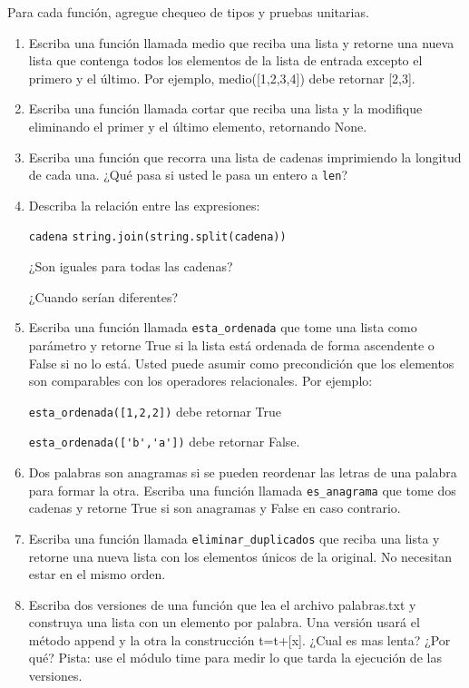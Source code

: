 Para cada función, agregue chequeo de tipos y pruebas unitarias.


\begin{enumerate}

 \item Escriba una función llamada medio que reciba una lista y retorne una nueva lista que contenga todos los elementos de la lista de 
 entrada excepto el primero y el último. Por ejemplo, medio([1,2,3,4]) debe retornar [2,3].

 \item Escriba una función llamada cortar que reciba una lista y la modifique eliminando el primer y el último elemento, retornando None.

 \item Escriba una función que  recorra una lista de cadenas 
   imprimiendo la longitud de cada una. ¿Qué pasa si usted
   le pasa un entero a  \texttt{len}?

 \item Describa la relación entre las expresiones: 
 
 \texttt{cadena} \hfill  {\tt string.join(string.split(cadena))}
 
 ¿Son iguales para todas las cadenas? 
 
 ¿Cuando serían diferentes?
  
  \item Escriba una función llamada \verb+esta_ordenada+ que tome una lista como parámetro y
  retorne True si la lista está ordenada de forma ascendente o False si no lo está.
  Usted puede asumir como precondición que los elementos son comparables con los 
  operadores relacionales. Por ejemplo: 
  
  \verb+esta_ordenada([1,2,2])+ debe retornar  True 
  
  \verb+esta_ordenada(['b','a'])+ debe retornar False.
  
  \item Dos palabras son anagramas si se pueden reordenar las letras de una palabra para formar
  la otra. Escriba una función llamada \verb+es_anagrama+ que tome dos cadenas y retorne True
  si son anagramas y False en caso contrario.
  
  \item Escriba una función llamada \verb+eliminar_duplicados+ que reciba una lista y retorne 
  una nueva lista con los elementos únicos de la original. No necesitan estar en el mismo 
  orden.
  
  
  \item Escriba dos versiones de una función que lea el archivo palabras.txt y construya una lista 
  con un elemento por palabra. Una versión usará el método append y la otra la construcción t=t+[x]. 
  ¿Cual es mas lenta? ¿Por qué?  Pista: use el módulo time para medir lo que tarda la ejecución 
  de las versiones.  
  

\end{enumerate}
